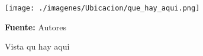 \begin{figure}[!htb]
  \begin{center}
\texttt{[image: ./imagenes/Ubicacion/que\_hay\_aqui.png]}
    \caption{Vista qu hay aqui}
    \label{fig:Vista_que_hay_aqui}
    \textbf{Fuente:}  Autores
  \end{center}
\end{figure}
